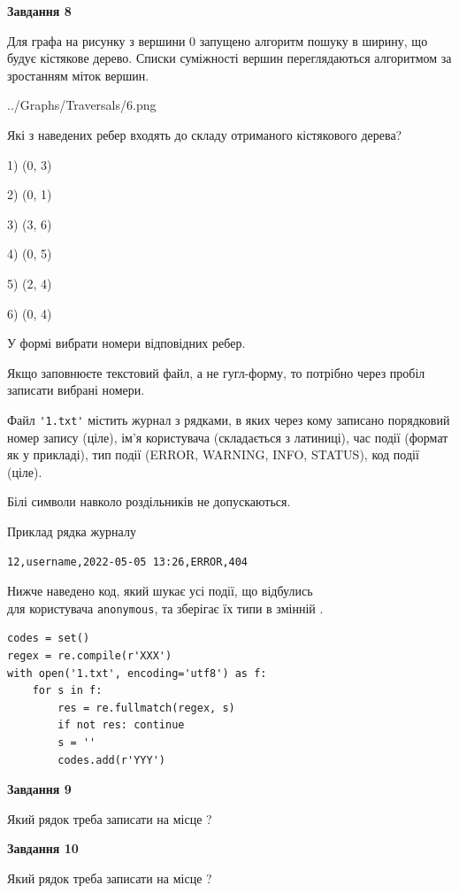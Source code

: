 \documentclass[12pt, ukrainian]{article}
\def\code#1{\Verb!#1!}
\begin{document}
{\begin {large}
{\begin {center}\textbf{Завдання 8}\end {center}}\par
Для графа на рисунку з вершини 0 запущено алгоритм пошуку в ширину, що будує кістякове дерево. Списки суміжності вершин переглядаються алгоритмом за зростанням міток вершин.\par
\begin{center}
	{../Graphs/Traversals/6.png}
\end{center}
\par Які з наведених ребер входять до складу отриманого кістякового дерева?\par
1) (0, 3)\par
2) (0, 1)\par
3) (3, 6)\par
4) (0, 5)\par
5) (2, 4)\par
6) (0, 4)\par
{\vskip 15pt} У формі вибрати номери відповідних ребер.


Якщо заповнюєте текстовий файл, а не гугл-форму, то потрібно через пробіл записа\-ти вибрані номери.\par
\newpage


Файл \code{'1.txt'} містить журнал з рядками, в яких через кому записано поряд\-ко\-вий номер запису (ціле), ім'я користувача (складається з латиниці), час події (фор\-мат як у прикладі), тип події (ERROR, WARNING, INFO, STATUS), код події (ціле).

Білі символи навколо роздільників не допускаються.

Приклад рядка журналу



\begin{verbatim}
12,username,2022-05-05 13:26,ERROR,404
\end{verbatim}


Нижче наведено код, який шукає усі події, що відбулись\\ для користувача \code{anonymous}, та зберігає їх типи в змінній .



\begin{verbatim}
codes = set()
regex = re.compile(r'XXX')
with open('1.txt', encoding='utf8') as f:
    for s in f:
        res = re.fullmatch(regex, s)
        if not res: continue
        s = ''
        codes.add(r'YYY')
\end{verbatim}


{\begin {center}\textbf{Завдання 9}\end {center}}\par
Який рядок треба записати на місце  ?\par
\vspace{5mm}


{\begin {center}\textbf{Завдання 10}\end {center}}\par
Який рядок треба записати на місце  ?\par


\newpage


\end {large}}
\end{document}
